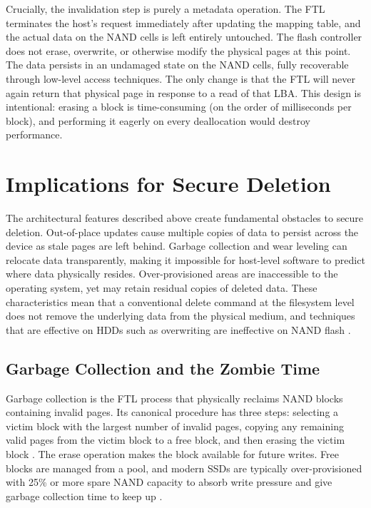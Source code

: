 Crucially, the invalidation step is purely a metadata operation. The FTL terminates the host's 
request immediately after updating the mapping table, and the actual data on the NAND cells is left 
entirely untouched. The flash controller does not erase, overwrite, or otherwise modify the physical 
pages at this point. The data persists in an undamaged state on the NAND cells, fully recoverable 
through low-level access techniques. The only change is that the FTL will never again return that 
physical page in response to a read of that LBA. This design is intentional: erasing a block is 
time-consuming (on the order of milliseconds per block), and performing it eagerly on every 
deallocation would destroy performance\cite{duplicateschen2022}. 


\section{Implications for Secure Deletion}

The architectural features described above create fundamental obstacles to secure deletion. Out-of-place updates 
cause multiple copies of data to persist across the device as stale pages are left behind. Garbage collection 
and wear leveling can relocate data transparently, making it impossible for host-level software to predict where 
data physically resides. Over-provisioned areas are inaccessible to the operating system, yet may retain residual 
copies of deleted data. These characteristics mean that a conventional delete command at the filesystem level 
does not remove the underlying data from the physical medium, and techniques that are effective on HDDs such as 
overwriting are ineffective on NAND flash \cite{aronsson2025secure}.

\subsection*{Garbage Collection and the Zombie Time}
Garbage collection is the FTL process that physically reclaims NAND blocks containing invalid pages. 
Its canonical procedure has three steps: selecting a victim block with the largest number of 
invalid pages, copying any remaining valid pages from the victim block to a free block, and then 
erasing the victim block \cite{duplicateschen2022}. The erase operation makes the block available 
for future writes. Free blocks are managed from a pool, and modern SSDs are typically 
over-provisioned with 25\% or more spare NAND capacity to absorb write pressure and give garbage 
collection time to keep up \cite{onarlioglu2018_3}. 

